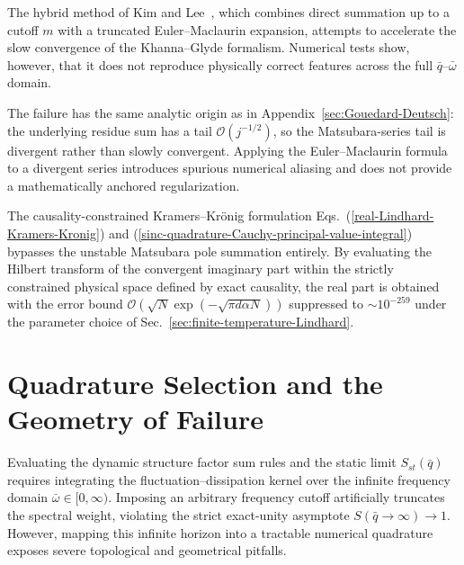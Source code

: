 \documentclass[aps,showkeys,noshowpacs,superscriptaddress,pre,preprint]{revtex4-2}
\let\label\orilabel
\begin{document}
The hybrid method of Kim and Lee~\cite{Kim-Lee1998},
which combines direct summation up to a cutoff $m$ with a truncated Euler--Maclaurin expansion,
attempts to accelerate the slow convergence of the Khanna--Glyde formalism.
Numerical tests show, however, that it does not reproduce physically correct features
across the full $\bar{q}$--$\bar{\omega}$ domain.

The failure has the same analytic origin as in Appendix~\ref{sec:Gouedard-Deutsch}:
the underlying residue sum has a tail $\mathcal{O}(j^{-1/2})$,
so the Matsubara-series tail is divergent rather than slowly convergent.
Applying the Euler--Maclaurin formula to a divergent series introduces
spurious numerical aliasing and does not provide a mathematically anchored regularization.

The causality-constrained Kramers--Kr\"onig formulation
Eqs.~(\ref{real-Lindhard-Kramers-Kronig}) and (\ref{sinc-quadrature-Cauchy-principal-value-integral})
bypasses the unstable Matsubara pole summation entirely.
By evaluating the Hilbert transform of the convergent imaginary part within the
strictly constrained physical space defined by exact causality,
the real part is obtained with the error bound $\mathcal{O}(\sqrt{N} \exp(-\sqrt{\pi d \alpha N}))$ suppressed to $\sim 10^{-259}$
under the parameter choice of Sec.~\ref{sec:finite-temperature-Lindhard}.

\section{Quadrature Selection and the Geometry of Failure}
\label{sec:quadrature-shootout}

Evaluating the dynamic structure factor sum rules and the static limit $S_{st}(\bar{q})$ requires integrating the fluctuation--dissipation kernel over the infinite frequency domain $\bar{\omega} \in [0, \infty)$. Imposing an arbitrary frequency cutoff artificially truncates the spectral weight, violating the strict exact-unity asymptote $S(\bar{q} \to \infty) \to 1$. However, mapping this infinite horizon into a tractable numerical quadrature exposes severe topological and geometrical pitfalls. 
\end{document}
